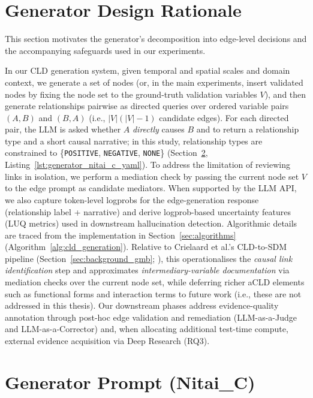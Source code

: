 \section{Generator Design Rationale}
\label{app:generator_design_rationale}

This section motivates the generator's decomposition into edge-level decisions and the accompanying safeguards used in our experiments.

In our CLD generation system, given temporal and spatial scales and domain context, we generate a set of nodes (or, in the main experiments, insert validated nodes by fixing the node set to the ground-truth validation variables \(V\)), and then generate relationships pairwise as directed queries over ordered variable pairs \((A,B)\) and \((B,A)\) (i.e., \( |V|(|V|-1)\) candidate edges). For each directed pair, the LLM is asked whether \(A\) \emph{directly} causes \(B\) and to return a relationship type and a short causal narrative; in this study, relationship types are constrained to \{\texttt{POSITIVE}, \texttt{NEGATIVE}, \texttt{NONE}\} (Section~\ref{sec:generator_prompt_nitai_c}, Listing~\ref{lst:generator_nitai_c_yaml}). To address the limitation of reviewing links in isolation, we perform a mediation check by passing the current node set \(V\) to the edge prompt as candidate mediators. When supported by the LLM API, we also capture token-level logprobs for the edge-generation response (relationship label + narrative) and derive logprob-based uncertainty features (LUQ metrics) used in downstream hallucination detection. Algorithmic details are traced from the implementation in Section~\ref{sec:algorithms} (Algorithm~\ref{alg:cld_generation}). Relative to Crielaard et al.'s CLD-to-SDM pipeline (Section~\ref{sec:background_gmb}; \citet{crielaard2024refining}), this operationalises the \emph{causal link identification} step and approximates \emph{intermediary-variable documentation} via mediation checks over the current node set, while deferring richer aCLD elements such as functional forms and interaction terms to future work (i.e., these are not addressed in this thesis). Our downstream phases address evidence-quality annotation through post-hoc edge validation and remediation (LLM-as-a-Judge and LLM-as-a-Corrector) and, when allocating additional test-time compute, external evidence acquisition via Deep Research (RQ3).

\section{Generator Prompt (Nitai\_C)}
\label{sec:generator_prompt_nitai_c}

